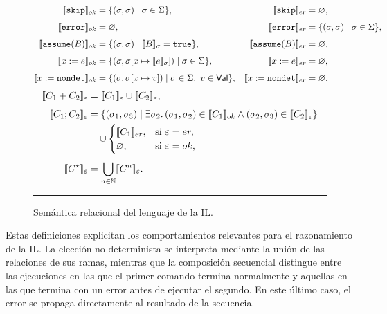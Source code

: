 \documentclass[a4paper,	11pt]{report}
\begin{document}
\begin{figure}[htbp]
\centering
\begin{minipage}{0.98\textwidth}
\small
$$
\begin{aligned}
\relax[\![\texttt{skip}]\!]_{ok} &= \{(\sigma,\sigma) \mid \sigma \in \Sigma\},
& [\![\texttt{skip}]\!]_{er} &= \varnothing, \\[4pt]
[\![\texttt{error}]\!]_{ok} &= \varnothing,
& [\![\texttt{error}]\!]_{er} &= \{(\sigma,\sigma) \mid \sigma\in\Sigma\}, \\[4pt]
[\![\texttt{assume}(B)]\!]_{ok} &= \{(\sigma,\sigma) \mid [\![B]\!]_\sigma = \texttt{true}\},
& [\![\texttt{assume}(B)]\!]_{er} &= \varnothing, \\[4pt]
[\![x := e]\!]_{ok} &= \{(\sigma,\sigma[x \mapsto [\![e]\!]_\sigma]) \mid \sigma \in \Sigma\},
& [\![x := e]\!]_{er} &= \varnothing, \\[4pt]
[\![x := \texttt{nondet}]\!]_{ok} &= \{(\sigma,\sigma[x \mapsto v]) \mid \sigma \in \Sigma,\ v \in \mathsf{Val}\},
& [\![x := \texttt{nondet}]\!]_{er} &= \varnothing.
\end{aligned}
$$
$$
\begin{aligned}
\relax[\![C_1 + C_2]\!]_{\varepsilon} &= [\![C_1]\!]_{\varepsilon} \cup [\![C_2]\!]_{\varepsilon}, \\[4pt]
[\![C_1;C_2]\!]_{\varepsilon} &= \{(\sigma_1,\sigma_3) \mid
  \exists \sigma_2. \, (\sigma_1,\sigma_2) \in [\![C_1]\!]_{ok} \land (\sigma_2,\sigma_3) \in [\![C_2]\!]_{\varepsilon}\} \\
  &\quad \cup
  \begin{cases}
    [\![C_1]\!]_{er}, & \text{si } \varepsilon = er,\\
    \varnothing, & \text{si } \varepsilon = ok,
  \end{cases} \\[4pt]
[\![C^\star]\!]_{\varepsilon} &= \displaystyle \bigcup_{n \in \mathbb{N}} [\![C^n]\!]_{\varepsilon}.
\end{aligned}
$$
\vspace{0.1em}
\end{minipage}
\rule{\linewidth}{0.4pt}
\caption{Semántica relacional del lenguaje de la IL.}
\label{fig:semantica-il}
\end{figure}

Estas definiciones explicitan los comportamientos relevantes para el razonamiento de la IL.
La elección no determinista se interpreta mediante la unión de las relaciones de sus ramas,
mientras que la composición secuencial distingue entre las ejecuciones en las que el primer comando termina normalmente
y aquellas en las que termina con un error antes de ejecutar el segundo.
En este último caso,
el error se propaga directamente al resultado de la secuencia.
\end{document}
